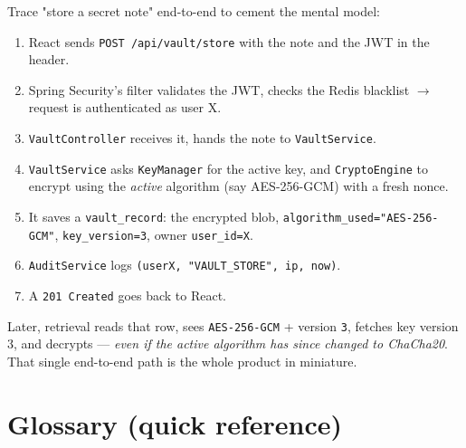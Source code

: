\documentclass[11pt,a4paper]{article}
\begin{document}
Trace "store a secret note" end-to-end to cement the mental model:

\begin{enumerate}[leftmargin=*]
  \item React sends \texttt{POST /api/vault/store} with the note and the JWT in the header.
  \item Spring Security's filter validates the JWT, checks the Redis blacklist $\rightarrow$
        request is authenticated as user X.
  \item \texttt{VaultController} receives it, hands the note to \texttt{VaultService}.
  \item \texttt{VaultService} asks \texttt{KeyManager} for the active key, and \texttt{CryptoEngine}
        to encrypt using the \emph{active} algorithm (say AES-256-GCM) with a fresh nonce.
  \item It saves a \texttt{vault\_record}: the encrypted blob, \texttt{algorithm\_used="AES-256-GCM"},
        \texttt{key\_version=3}, owner \texttt{user\_id=X}.
  \item \texttt{AuditService} logs \texttt{(userX, "VAULT\_STORE", ip, now)}.
  \item A \texttt{201 Created} goes back to React.
\end{enumerate}

Later, retrieval reads that row, sees \texttt{AES-256-GCM} + version \texttt{3}, fetches key
version 3, and decrypts — \emph{even if the active algorithm has since changed to ChaCha20}. That
single end-to-end path is the whole product in miniature.

\section{Glossary (quick reference)}
\end{document}
